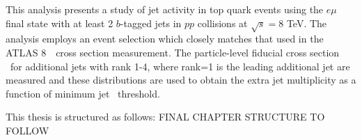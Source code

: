 This analysis presents a study of jet activity in top quark events using the $e\mu$ final state 
with at least 2 $b$-tagged jets in $pp$ collisions at $\sqrt{s}=8$ TeV. The analysis employs
an event selection which closely matches that used in the ATLAS 8~\TeV\ cross
section measurement\cite{xsec}.
The particle-level fiducial cross section \sigmapti\ for additional jets with 
rank 1-4, where rank=1  is the leading additional jet are measured and
these distributions are used to obtain the extra jet multiplicity as a function of minimum jet \pt\ threshold. 

This thesis is structured as follows: FINAL CHAPTER STRUCTURE TO FOLLOW